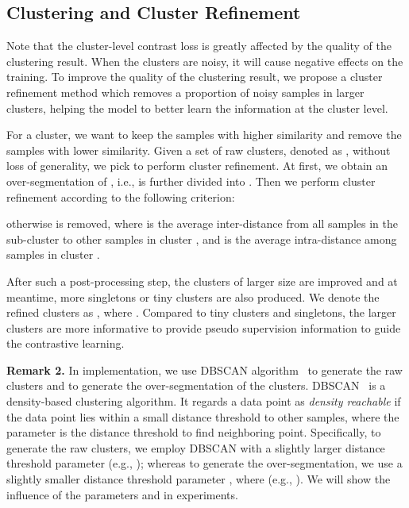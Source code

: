 \documentclass[journal]{IEEEtran}
\def\ie{i.e.}
\def\eg{e.g.}
\newcommand{\myparagraph}[1]{\noindent\textbf{#1.}}
\begin{document}
\subsection{Clustering and Cluster Refinement}
 
Note that the cluster-level contrast loss is greatly affected by the quality of the clustering result. When the clusters are noisy, it will cause negative effects on the training. To improve the quality of the clustering result, we propose a cluster refinement method which removes a proportion of noisy samples in larger clusters, helping the model to better learn the information at the cluster level.



For a cluster, we want to keep the samples with higher similarity and remove the samples with lower similarity.  Given a set of raw clusters, denoted as , without loss of generality, we pick  to perform cluster refinement. 
At first, we obtain an over-segmentation of , \ie,  is further divided into . Then we perform cluster refinement according to the following criterion:

otherwise  is removed, where  is the average inter-distance from all samples in the sub-cluster  to other samples in cluster , and  is the average intra-distance among samples in cluster . 


After such a post-processing step, the clusters of larger size are improved and at meantime, 
more singletons or tiny clusters are also produced. We denote the refined clusters as , where . Compared to tiny clusters and singletons, the larger clusters are more informative to provide pseudo supervision information to guide the contrastive learning. 

\myparagraph{Remark 2}
In implementation, we use DBSCAN algorithm~\cite{EsterDBSCAN:AAAI96} to generate the raw clusters and to generate the over-segmentation of the clusters. 
DBSCAN~\cite{EsterDBSCAN:AAAI96} is a density-based clustering algorithm. It regards a data point as \emph{density reachable} if the data point lies within a small distance threshold  to other samples, where the parameter  is the distance threshold to find neighboring point. 
Specifically, to generate the raw clusters, we employ DBSCAN with a slightly larger distance threshold parameter  (\eg, ); whereas to generate the over-segmentation, we use a slightly smaller distance threshold parameter , where  (\eg, ). 
We will show the influence of the parameters  and  in experiments.  
\end{document}
